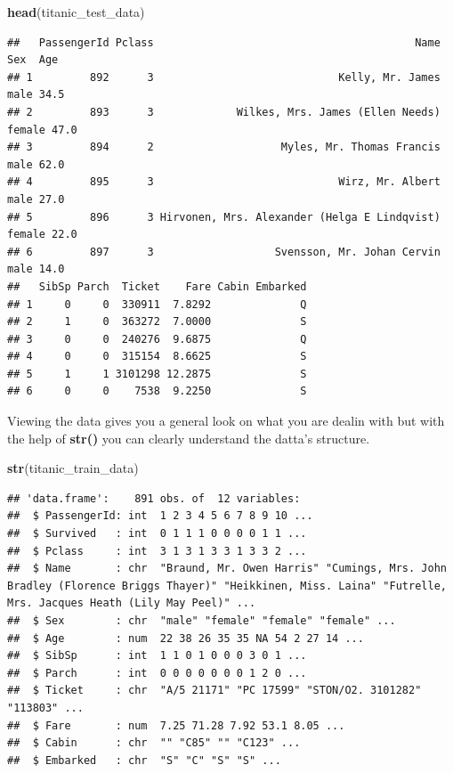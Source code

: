 \documentclass[
]{article}
\newenvironment{Shaded}{\begin{snugshade}}{\end{snugshade}}
\newcommand{\FunctionTok}[1]{\textcolor[rgb]{0.13,0.29,0.53}{\textbf{#1}}}
\newcommand{\NormalTok}[1]{#1}
\begin{document}
\begin{Shaded}
\begin{Highlighting}[]
\FunctionTok{head}\NormalTok{(titanic\_test\_data)}
\end{Highlighting}
\end{Shaded}

\begin{verbatim}
##   PassengerId Pclass                                         Name    Sex  Age
## 1         892      3                             Kelly, Mr. James   male 34.5
## 2         893      3             Wilkes, Mrs. James (Ellen Needs) female 47.0
## 3         894      2                    Myles, Mr. Thomas Francis   male 62.0
## 4         895      3                             Wirz, Mr. Albert   male 27.0
## 5         896      3 Hirvonen, Mrs. Alexander (Helga E Lindqvist) female 22.0
## 6         897      3                   Svensson, Mr. Johan Cervin   male 14.0
##   SibSp Parch  Ticket    Fare Cabin Embarked
## 1     0     0  330911  7.8292              Q
## 2     1     0  363272  7.0000              S
## 3     0     0  240276  9.6875              Q
## 4     0     0  315154  8.6625              S
## 5     1     1 3101298 12.2875              S
## 6     0     0    7538  9.2250              S
\end{verbatim}

Viewing the data gives you a general look on what you are dealin with
but with the help of \textbf{str()} you can clearly understand the
datta's structure.

\begin{Shaded}
\begin{Highlighting}[]
\FunctionTok{str}\NormalTok{(titanic\_train\_data)}
\end{Highlighting}
\end{Shaded}

\begin{verbatim}
## 'data.frame':    891 obs. of  12 variables:
##  $ PassengerId: int  1 2 3 4 5 6 7 8 9 10 ...
##  $ Survived   : int  0 1 1 1 0 0 0 0 1 1 ...
##  $ Pclass     : int  3 1 3 1 3 3 1 3 3 2 ...
##  $ Name       : chr  "Braund, Mr. Owen Harris" "Cumings, Mrs. John Bradley (Florence Briggs Thayer)" "Heikkinen, Miss. Laina" "Futrelle, Mrs. Jacques Heath (Lily May Peel)" ...
##  $ Sex        : chr  "male" "female" "female" "female" ...
##  $ Age        : num  22 38 26 35 35 NA 54 2 27 14 ...
##  $ SibSp      : int  1 1 0 1 0 0 0 3 0 1 ...
##  $ Parch      : int  0 0 0 0 0 0 0 1 2 0 ...
##  $ Ticket     : chr  "A/5 21171" "PC 17599" "STON/O2. 3101282" "113803" ...
##  $ Fare       : num  7.25 71.28 7.92 53.1 8.05 ...
##  $ Cabin      : chr  "" "C85" "" "C123" ...
##  $ Embarked   : chr  "S" "C" "S" "S" ...
\end{verbatim}
\end{document}
